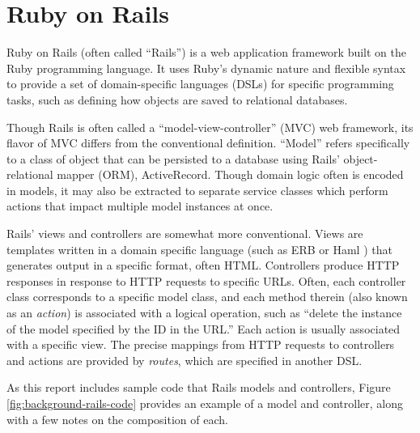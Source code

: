 \documentclass[document.tex]{subfiles}
\begin{document}
\section {Ruby on Rails}

Ruby on Rails \cite{rails} (often called ``Rails'') is a web application framework built on the Ruby programming language. It uses Ruby's dynamic nature and flexible syntax to provide a set of domain-specific languages (DSLs) for specific programming tasks, such as defining how objects are saved to relational databases.

Though Rails is often called a ``model-view-controller'' (MVC) web framework, its flavor of MVC differs from the conventional definition. ``Model'' refers specifically to a class of object that can be persisted to a database using Rails' object-relational mapper (ORM), ActiveRecord. Though domain logic often is encoded in models, it may also be extracted to separate service classes which perform actions that impact multiple model instances at once.

Rails' views and controllers are somewhat more conventional. Views are templates written in a domain specific language (such as ERB \cite{erb} or Haml \cite{haml}) that generates output in a specific format, often HTML. Controllers produce HTTP responses in response to HTTP requests to specific URLs. Often, each controller class corresponds to a specific model class, and each method therein (also known as an \emph{action}) is associated with a logical operation, such as ``delete the instance of the model specified by the ID in the URL.'' Each action is usually associated with a specific view. The precise mappings from HTTP requests to controllers and actions are provided by \emph{routes}, which are specified in another DSL.


As this report includes sample code that Rails models and controllers, Figure \ref{fig:background-rails-code} provides an example of a model and controller, along with a few notes on the composition of each.
\end{document}

